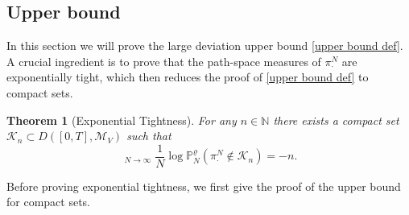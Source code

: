 \documentclass[11pt]{article}
\numberwithin{equation}{section}
\DeclareMathOperator*\uplim{\overline{lim}}
\theoremstyle{definition}
\theoremstyle{plain}
\newtheorem{Theorem}{Theorem}[section]
\newcommand{\p}{\mathbb{P}}
\begin{document}
\subsection{Upper bound}
In this section we will prove the large deviation upper bound \eqref{upper bound def}. A crucial ingredient is to prove that the path-space measures of $\pi^N_{\cdot}$ are exponentially tight, which then reduces the proof of \eqref{upper bound def} to compact sets.
\begin{Theorem}[Exponential Tightness] \label{exponential tightness}
For any $n\in\mathbb{N}$ there exists a compact set $\mathcal{K}_n\subset D([0,T],\mathcal{M}_V)$ such that 
    \begin{equation}\label{exp tight eq}
        \uplim_{N\to\infty} \frac{1}{N} \log \p^{\varrho}_N(\pi^N_{\cdot} \notin \mathcal{K}_n) = -n.
    \end{equation}
\end{Theorem}
Before proving  exponential tightness, we first give the proof of the upper bound for compact sets. 
\end{document}
